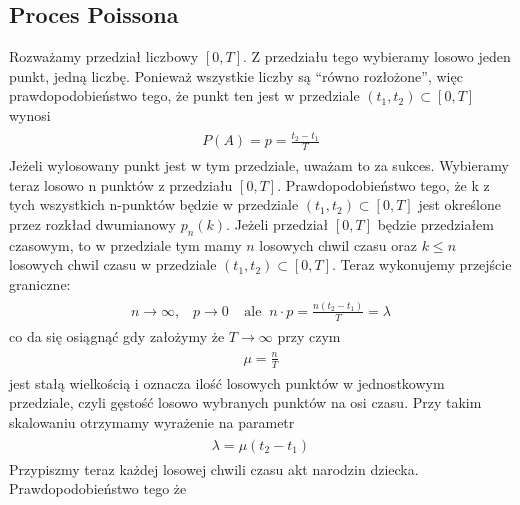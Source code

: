 \documentclass[a4paper,12pt,polish]{sphinxmanual}
\begin{document}
\subsection{Proces Poissona}
\label{ch3/chIII021:proces-poissona}
Rozważamy przedział liczbowy $[0, T]$. Z przedziału tego wybieramy losowo jeden punkt, jedną liczbę. Ponieważ wszystkie liczby są ``równo rozłożone'', więc prawdopodobieństwo tego, że punkt ten jest w przedziale $(t_1, t_2)\subset [0, T]$ wynosi
\label{ch3/chIII021:equation-eqn16}\begin{gather}
\begin{split}P(A)= p = \frac{t_2 -t_1}{T}\end{split}\label{ch3/chIII021-eqn16}
\end{gather}
Jeżeli wylosowany punkt jest w tym przedziale, uważam to za sukces. Wybieramy teraz losowo n punktów z przedziału $[0, T]$. Prawdopodobieństwo tego, że k z tych wszystkich n-punktów będzie w przedziale $(t_1, t_2)\subset [0, T]$ jest określone przez rozkład dwumianowy $p_n(k)$. Jeżeli przedział $[0, T]$ będzie przedziałem czasowym, to w przedziale tym mamy $n$ losowych chwil czasu oraz $k \le n$ losowych chwil czasu w przedziale $(t_1, t_2)\subset [0, T]$. Teraz wykonujemy przejście graniczne:
\label{ch3/chIII021:equation-eqn17}\begin{gather}
\begin{split}n \to \infty, \;\;\; p \to 0 \;\;\;\; \mbox{ale} \;\;n\cdot p = \frac{n(t_2 - t_1)}{T} = \lambda\end{split}\label{ch3/chIII021-eqn17}
\end{gather}
co da się osiągnąć gdy założymy że $T \to \infty$ przy czym
\label{ch3/chIII021:equation-eqn18}\begin{gather}
\begin{split}\mu = \frac{n}{T}\end{split}\label{ch3/chIII021-eqn18}
\end{gather}
jest stałą wielkością i oznacza ilość losowych punktów w jednostkowym przedziale, czyli gęstość losowo wybranych punktów na osi czasu.
Przy takim skalowaniu otrzymamy wyrażenie na parametr
\label{ch3/chIII021:equation-eqn19}\begin{gather}
\begin{split}\lambda = \mu (t_2 -t_1)\end{split}\label{ch3/chIII021-eqn19}
\end{gather}
Przypiszmy teraz każdej losowej chwili czasu akt narodzin dziecka. Prawdopodobieństwo tego że
\end{document}
